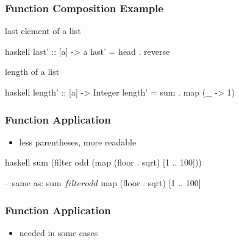 \documentclass[dvipsnames]{beamer}
\theoremstyle{plain}
\begin{document}
\begin{frame}[fragile]
  \frametitle{Function Composition Example}

  \begin{exampleblock}{last element of a list}
    \begin{pygments}{haskell}
last' :: [a] -> a
last' = head . reverse
    \end{pygments}
  \end{exampleblock}

  \pause
  \begin{exampleblock}{length of a list}
    \begin{pygments}{haskell}
length' :: [a] -> Integer
length' = sum . map (\_ -> 1)
    \end{pygments}
  \end{exampleblock}
\end{frame}

\begin{frame}[fragile]
  \frametitle{Function Application}


  \begin{itemize}
    \item less parentheses, more readable
  \end{itemize}

  \begin{exampleblock}{}
    \begin{pygments}{haskell}
sum (filter odd (map (floor . sqrt) [1 .. 100]))

-- same as:
sum $ filter odd $ map (floor . sqrt) [1 .. 100]
    \end{pygments}
  \end{exampleblock}
\end{frame}

\begin{frame}[fragile]
  \frametitle{Function Application}

  \begin{itemize}
    \item needed in some cases
  \end{itemize}

  \begin{exampleblock}{}
  \end{exampleblock}
\end{frame}
\end{document}
